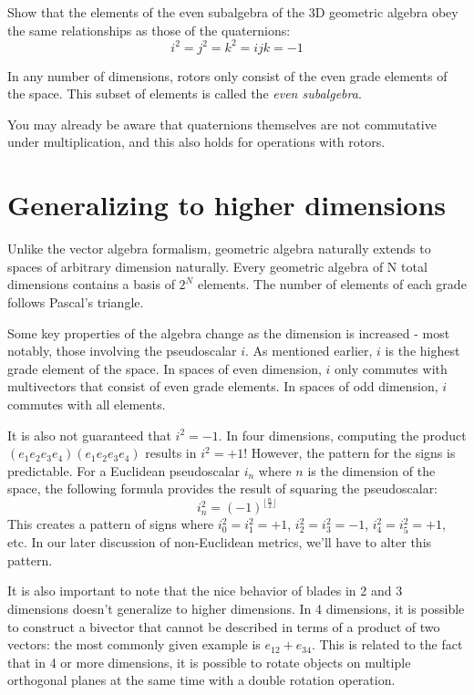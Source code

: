 \begin{expl}
    Show that the elements of the even subalgebra of the 3D geometric algebra obey the same 
    relationships as those of the quaternions: $$i^2 = j^2 = k^2 = ijk = -1$$
\end{expl}

In any number of dimensions, rotors only consist of the even grade elements of the space. This
subset of elements is called the \textit{even subalgebra}.

You may already be aware that quaternions themselves are not commutative under multiplication, and
this also holds for operations with rotors.

\section{Generalizing to higher dimensions}

Unlike the vector algebra formalism, geometric algebra naturally extends to spaces of arbitrary
dimension naturally. Every geometric algebra of N total dimensions contains a basis of $2^N$
elements. The number of elements of each grade follows Pascal's triangle.

Some key properties of the algebra change as the dimension is increased - most notably, those
involving the pseudoscalar $i$. As mentioned earlier, $i$ is the highest grade element of the space.
In spaces of even dimension, $i$ only commutes with multivectors that consist of even grade
elements. In spaces of odd dimension, $i$ commutes with all elements.

It is also not guaranteed that $i^2 = -1$. In four dimensions, computing the product
$\left(e_1 e_2 e_3 e_4\right)\left(e_1 e_2 e_3 e_4\right)$ results in $i^2 = +1$! However, the
pattern for the signs is predictable. For a Euclidean pseudoscalar $i_n$ where $n$ is the dimension
of the space, the following formula provides the result of squaring the pseudoscalar: 
$$
i_n^2 = \left(-1\right)^{\lfloor \frac{n}{2} \rfloor}
$$
This creates a pattern of signs where $i_0^2 = i_1^2 = +1$, $i_2^2 = i_3^2 = -1$, $i_4^2 = i_5^2 =
+1$, etc. In our later discussion of non-Euclidean metrics, we'll have to alter this pattern.

It is also important to note that the nice behavior of blades in 2 and 3 dimensions doesn't 
generalize to higher dimensions. In 4 dimensions, it is possible to construct a bivector that
cannot be described in terms of a product of two vectors: the most commonly given example is
$e_{12} + e_{34}$. This is related to the fact that in 4 or more dimensions, it is possible to 
rotate objects on multiple orthogonal planes at the same time with a double rotation operation.

